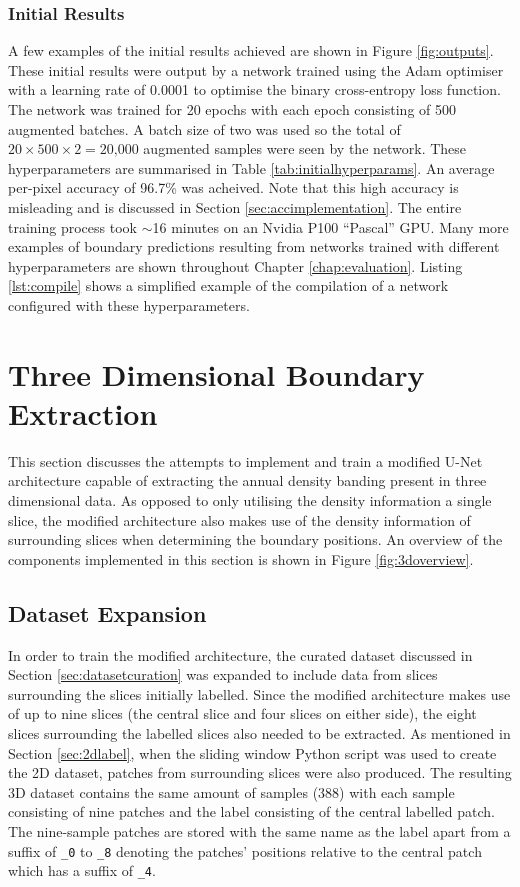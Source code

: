 \subsubsection{Initial Results}

A few examples of the initial results achieved are shown in Figure \ref{fig:outputs}. These initial results were output by a network trained using the Adam optimiser~\cite{adam} with a learning rate of 0.0001 to optimise the binary cross-entropy loss function. The network was trained for 20 epochs with each epoch consisting of 500 augmented batches. A batch size of two was used so the total of $20\times500\times2=\text{20,000}$ augmented samples were seen by the network. These hyperparameters are summarised in Table \ref{tab:initialhyperparams}. An average per-pixel accuracy of 96.7\% was acheived. Note that this high accuracy is misleading and is discussed in Section \ref{sec:accimplementation}. The entire training process took ${\sim}$16 minutes on an Nvidia P100 ``Pascal'' GPU. Many more examples of boundary predictions resulting from networks trained with different hyperparameters are shown throughout Chapter \ref{chap:evaluation}. Listing \ref{lst:compile} shows a simplified example of the compilation of a network configured with these hyperparameters.

\section{Three Dimensional Boundary Extraction}
\label{sec:threedimension}

This section discusses the attempts to implement and train a modified U-Net architecture capable of extracting the annual density banding present in three dimensional data. As opposed to only utilising the density information a single slice, the modified architecture also makes use of the density information of surrounding slices when determining the boundary positions. An overview of the components implemented in this section is shown in Figure \ref{fig:3doverview}.

\subsection{Dataset Expansion}

In order to train the modified architecture, the curated dataset discussed in Section \ref{sec:datasetcuration} was expanded to include data from slices surrounding the slices initially labelled. Since the modified architecture makes use of up to nine slices (the central slice and four slices on either side), the eight slices surrounding the labelled slices also needed to be extracted. As mentioned in Section \ref{sec:2dlabel}, when the sliding window Python script was used to create the 2D dataset, patches from surrounding slices were also produced. The resulting 3D dataset contains the same amount of samples (388) with each sample consisting of nine patches and the label consisting of the central labelled patch. The nine-sample patches are stored with the same name as the label apart from a suffix of \texttt{\_0} to \texttt{\_8} denoting the patches' positions relative to the central patch which has a suffix of \texttt{\_4}.

